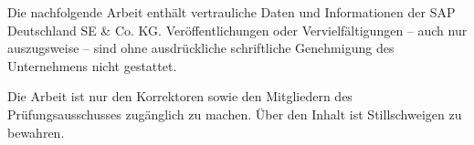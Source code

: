 Die nachfolgende Arbeit enthält vertrauliche Daten und Informationen der SAP Deutschland SE \& Co. KG.
Veröffentlichungen oder Vervielfältigungen -- auch nur auszugsweise -- sind ohne ausdrückliche schriftliche Genehmigung des Unternehmens nicht gestattet.

Die Arbeit ist nur den Korrektoren sowie den Mitgliedern des Prüfungsausschusses zugänglich zu machen.
Über den Inhalt ist Stillschweigen zu bewahren.